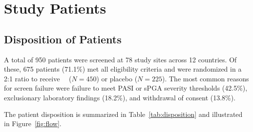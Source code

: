 \section{Study Patients}

\subsection{Disposition of Patients}

A total of 950 patients were screened at 78 study sites across 12 countries. Of these, 675 patients (71.1\%) met all eligibility criteria and were randomized in a 2:1 ratio to receive \studydrug\ \studydose\ ($N=450$) or placebo ($N=225$). The most common reasons for screen failure were failure to meet PASI or sPGA severity thresholds (42.5\%), exclusionary laboratory findings (18.2\%), and withdrawal of consent (13.8\%).

\vspace{4pt}
The patient disposition is summarized in Table~\ref{tab:disposition} and illustrated in Figure~\ref{fig:flow}.

